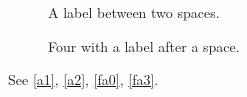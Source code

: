 \documentclass[twocolumn]{article}
\begin{document}
\begin{figure}
\centering
\subfigure[One]{
        \rule{0.475\textwidth}{1cm}
        \label{a1}
}
\subfigure[Two]{
        \rule{0.475\textwidth}{1cm}
        \label{a2}
}
\caption{A label between two spaces.}\label{f1}
\end{figure}
\begin{figure}
\centering
\subfigure[Panel 0]{
\rule{0.23\textwidth}{1cm} \label{fa0}
}
\hfill
\subfigure[Panel 1]{
\rule{0.23\textwidth}{1cm} \label{fa1}
}
\hfill
\subfigure[Panel 2]{
\rule{0.23\textwidth}{1cm} \label{fa2}
}
\hfill
\subfigure[Panel 3]{
\rule{0.23\textwidth}{1cm} \label{fa3}
}
\hfill
\caption{Four with a label after a space.}\label{f2}
\end{figure}
See \ref{a1}, \ref{a2}, \ref{fa0}, \ref{fa3}.
\end{document}

